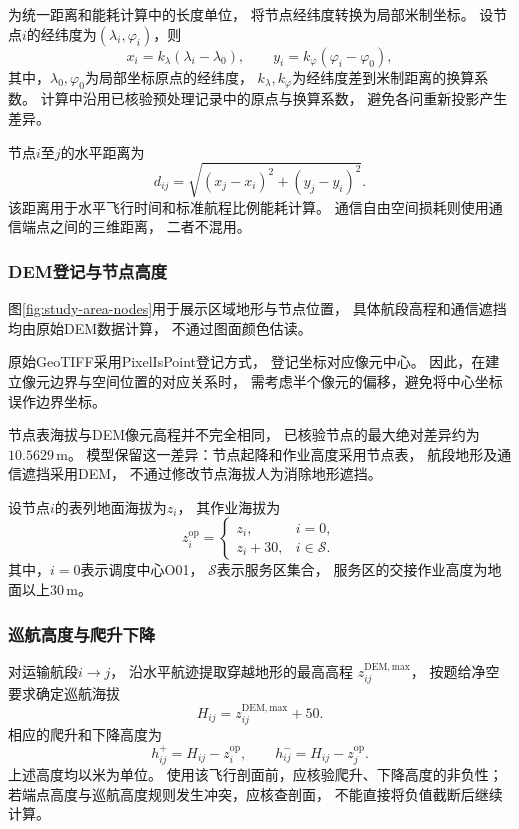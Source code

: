 \documentclass[bwprint]{gmcmthesis}
\begin{document}
为统一距离和能耗计算中的长度单位，
将节点经纬度转换为局部米制坐标。
设节点$i$的经纬度为$(\lambda_i,\varphi_i)$，则
\begin{equation}
    x_i=k_{\lambda}(\lambda_i-\lambda_0),
    \qquad
    y_i=k_{\varphi}(\varphi_i-\varphi_0),
\end{equation}
其中，$\lambda_0,\varphi_0$为局部坐标原点的经纬度，
$k_{\lambda},k_{\varphi}$为经纬度差到米制距离的换算系数。
计算中沿用已核验预处理记录中的原点与换算系数，
避免各问重新投影产生差异。

节点$i$至$j$的水平距离为
\begin{equation}
    d_{ij}
    =
    \sqrt{(x_j-x_i)^2+(y_j-y_i)^2}.
\end{equation}
该距离用于水平飞行时间和标准航程比例能耗计算。
通信自由空间损耗则使用通信端点之间的三维距离，
二者不混用。

\subsubsection{DEM登记与节点高度}

图\ref{fig:study-area-nodes}用于展示区域地形与节点位置，
具体航段高程和通信遮挡均由原始DEM数据计算，
不通过图面颜色估读。

原始GeoTIFF采用PixelIsPoint登记方式，
登记坐标对应像元中心。
因此，在建立像元边界与空间位置的对应关系时，
需考虑半个像元的偏移，避免将中心坐标误作边界坐标。

节点表海拔与DEM像元高程并不完全相同，
已核验节点的最大绝对差异约为$10.5629\,\mathrm{m}$。
模型保留这一差异：节点起降和作业高度采用节点表，
航段地形及通信遮挡采用DEM，
不通过修改节点海拔人为消除地形遮挡。

设节点$i$的表列地面海拔为$z_i$，
其作业海拔为
\begin{equation}
    z_i^{\mathrm{op}}
    =
    \begin{cases}
        z_i, & i=0,\\
        z_i+30, & i\in\mathcal{S}.
    \end{cases}
\end{equation}
其中，$i=0$表示调度中心O01，
$\mathcal{S}$表示服务区集合，
服务区的交接作业高度为地面以上$30\,\mathrm{m}$。

\subsubsection{巡航高度与爬升下降}

对运输航段$i\to j$，
沿水平航迹提取穿越地形的最高高程
$z_{ij}^{\mathrm{DEM,max}}$，
按题给净空要求确定巡航海拔
\begin{equation}
    H_{ij}
    =
    z_{ij}^{\mathrm{DEM,max}}+50.
\end{equation}
相应的爬升和下降高度为
\begin{equation}
    h_{ij}^{+}
    =
    H_{ij}-z_i^{\mathrm{op}},
    \qquad
    h_{ij}^{-}
    =
    H_{ij}-z_j^{\mathrm{op}}.
\end{equation}
上述高度均以米为单位。
使用该飞行剖面前，应核验爬升、下降高度的非负性；
若端点高度与巡航高度规则发生冲突，应核查剖面，
不能直接将负值截断后继续计算。
\end{document}

